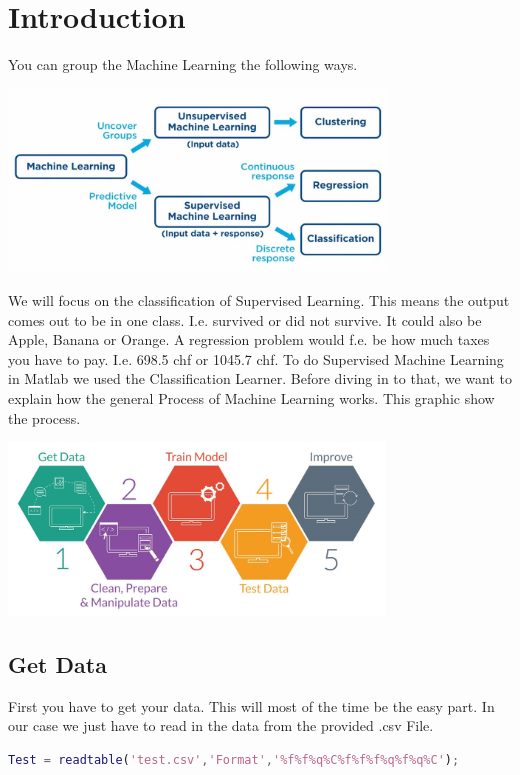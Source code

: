 \documentclass[
   10.5pt,
   invert-title=true,
   titlepage=false,
   titleimage-ratio=13,
   class=article
]{bfhpub}				%
\begin{document}
\section*{Introduction}
You can group the Machine Learning the following ways.
\begin{center}
	\includegraphics[width=100mm]{overview}
\end{center}

We will focus on the classification of Supervised Learning. This means the output comes out to be in one class. I.e. survived or did not survive. It could also be Apple, Banana or Orange. A regression problem would f.e. be how much taxes you have to pay. I.e. 698.5 chf or 1045.7 chf. To do Supervised Machine Learning in Matlab we used the Classification Learner. Before diving in to that, we want to explain how the general Process of Machine Learning works. This graphic show the process.
\begin{center}
	\includegraphics[width=100mm]{process}
\end{center}

\subsection*{Get Data}
First you have to get your data. This will most of the time be the easy part. In our case we just have to read in the data from the provided .csv File.
\begin{lstlisting}[language=Matlab]
Test = readtable('test.csv','Format','%f%f%q%C%f%f%f%q%f%q%C');
\end{lstlisting}
\end{document}

